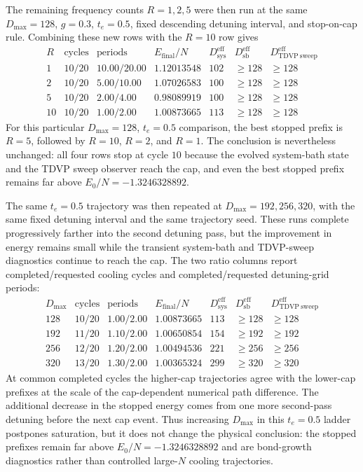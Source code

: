 \documentclass[aps,pra,twocolumn,superscriptaddress,nolongbibliography,nobalancelastpage,10pt]{revtex4-2}
\begin{document}
The remaining frequency counts \(R=1,2,5\) were then run at the same
\(D_{\max}=128\), \(g=0.3\), \(t_e=0.5\), fixed descending detuning interval,
and stop-on-cap rule.  Combining these new rows with the \(R=10\) row gives
\[
\begin{array}{c|c|c|c|c|c|c}
R & \text{cycles} & \text{periods}
  & E_{\mathrm{final}}/N & D_{\mathrm{sys}}^{\mathrm{eff}}
  & D_{\mathrm{sb}}^{\mathrm{eff}}
  & D_{\mathrm{TDVP\ sweep}}^{\mathrm{eff}}\\
\hline
1 & 10/20 & 10.00/20.00 & 1.12013548 & 102 & \geq 128 & \geq 128\\
2 & 10/20 & 5.00/10.00 & 1.07026583 & 100 & \geq 128 & \geq 128\\
5 & 10/20 & 2.00/4.00 & 0.98089919 & 100 & \geq 128 & \geq 128\\
10 & 10/20 & 1.00/2.00 & 1.00873665 & 113 & \geq 128 & \geq 128
\end{array}
\]
For this particular \(D_{\max}=128\), \(t_e=0.5\) comparison, the best stopped
prefix is \(R=5\), followed by \(R=10\), \(R=2\), and \(R=1\).  The conclusion is
nevertheless unchanged: all four rows stop at cycle \(10\) because the evolved
system-bath state and the TDVP sweep observer reach the cap, and even the best
stopped prefix remains far above \(E_0/N=-1.3246328892\).

The same \(t_e=0.5\) trajectory was then repeated at
\(D_{\max}=192,256,320\), with the same fixed detuning interval and the same
trajectory seed.  These runs complete progressively farther into the second
detuning pass, but the improvement in energy remains small while the transient
system-bath and TDVP-sweep diagnostics continue to reach the cap.  The two
ratio columns report completed/requested cooling cycles and completed/requested
detuning-grid periods:
\[
\begin{array}{c|c|c|c|c|c|c}
D_{\max} & \text{cycles} & \text{periods}
  & E_{\mathrm{final}}/N & D_{\mathrm{sys}}^{\mathrm{eff}}
  & D_{\mathrm{sb}}^{\mathrm{eff}}
  & D_{\mathrm{TDVP\ sweep}}^{\mathrm{eff}}\\
\hline
128 & 10/20 & 1.00/2.00 & 1.00873665 & 113 & \geq 128 & \geq 128\\
192 & 11/20 & 1.10/2.00 & 1.00650854 & 154 & \geq 192 & \geq 192\\
256 & 12/20 & 1.20/2.00 & 1.00494536 & 221 & \geq 256 & \geq 256\\
320 & 13/20 & 1.30/2.00 & 1.00365324 & 299 & \geq 320 & \geq 320
\end{array}
\]
At common completed cycles the higher-cap trajectories agree with the lower-cap
prefixes at the scale of the cap-dependent numerical path difference.  The
additional decrease in the stopped energy comes from one more second-pass
detuning before the next cap event.  Thus increasing \(D_{\max}\) in this
\(t_e=0.5\) ladder postpones saturation, but it does not change the physical
conclusion: the stopped prefixes remain far above
\(E_0/N=-1.3246328892\) and are bond-growth diagnostics rather than controlled
large-\(N\) cooling trajectories.
\end{document}
